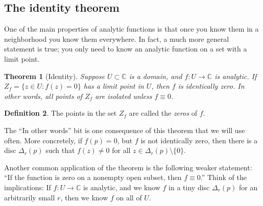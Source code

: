 \documentclass[12pt,openany]{book}
\newcommand{\C}{{\mathbb{C}}}
\newcommand{\myquote}[1]{``#1''}
\theoremstyle{plain}
\newtheorem{thm}{Theorem}[section]
\theoremstyle{remark}
\theoremstyle{definition}
\newtheorem{defn}[thm]{Definition}
\theoremstyle{exercise}
\theoremstyle{example}
\begin{document}
\subsection{The identity theorem}

One of the main properties of analytic functions is that once you know them
in a neighborhood you know them everywhere.  In fact, a much more general
statement is true; you only need to know an analytic function on a set with
a limit point.

\begin{thm}[Identity]%
\label{thm:identity}
Suppose $U \subset \C$ is a domain, 
and $f \colon U \to \C$ is analytic.
If $Z_f = \bigl\{ z \in U : f(z) = 0 \bigr\}$
has a limit point in $U$, then $f$ is identically zero.
In other words, all points of $Z_f$ are isolated unless $f \equiv 0$.
\end{thm}

\begin{defn}
The points in the set $Z_f$ are called the \emph{zeros} of $f$.
\end{defn}

The \myquote{In other words} bit is
one consequence of this theorem that we will use often.  More
concretely, if $f(p)=0$, but $f$ is not
identically zero, then there is a disc $\Delta_r(p)$ such that $f(z) \not=
0$ for all $z \in \Delta_r(p) \setminus \{ 0 \}$.

Another common application of the theorem is the following weaker statement:
\myquote{If the function is zero on a nonempty open subset, then $f \equiv 0$.}
Think of the implications:  If $f \colon U \to \C$ is analytic, and we know
$f$ in a tiny disc $\Delta_r(p)$ for an arbitrarily small $r$, then
we know $f$ on all of $U$.
\end{document}
